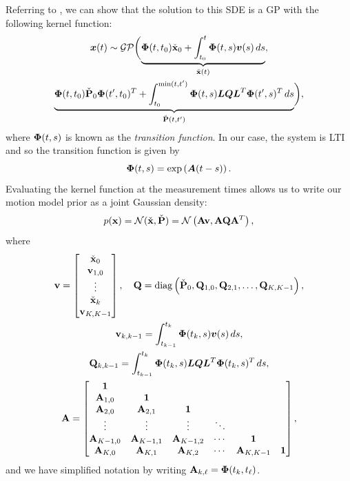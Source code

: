Referring to \citet{barfoot_ser24}, we can show that the solution to this \ac{SDE} is a \ac{GP} with the following kernel function:
\begin{multline}
{\boldsymbol{x}}(t) \sim \mathcal{GP} \biggl(  \underbrace{{\boldsymbol{\Phi}}(t,t_0)\check{\mathbf{x}}_0 + \int_{t_0}^t {\boldsymbol{\Phi}}(t,s) {\boldsymbol{v}}(s) \, ds}_{\check{\mathbf{x}}(t)},  \\ \underbrace{{\boldsymbol{\Phi}}(t,t_0) \check{\mathbf{P}}_0 {\boldsymbol{\Phi}}(t^\prime,t_0)^T + \int_{t_0}^{\min(t,t^\prime)} {\boldsymbol{\Phi}}(t,s) {\boldsymbol{L}}{\boldsymbol{Q}}{\boldsymbol{L}}^T {\boldsymbol{\Phi}}(t^\prime,s)^T  \, ds}_{\check{\mathbf{P}}(t,t^\prime)} \biggr),
\end{multline}
where ${\boldsymbol{\Phi}}(t,s)$ is known as the {\em transition function}.  In our case, the system is \ac{LTI} and so the transition function is given by
\begin{equation}
{\boldsymbol{\Phi}}(t,s) = \exp\left( {\boldsymbol{A}}(t-s) \right).
\end{equation}
Evaluating the kernel function at the measurement times allows us to write our motion model prior as a joint Gaussian density:
\begin{equation}
\label{eq:gpprior}
p(\mathbf{x}) = \mathcal{N}(\check{\mathbf{x}}, \check{\mathbf{P}}) = \mathcal{N} \left( \mathbf{A} \mathbf{v}, \mathbf{A} \mathbf{Q} \mathbf{A}^T \right),
\end{equation}
where
\begin{gather}
\mathbf{v} = \begin{bmatrix} \check{\mathbf{x}}_0 \\ \mathbf{v}_{1,0} \\ \vdots \\ \check{\mathbf{x}}_k\\ \mathbf{v}_{K,K-1} \end{bmatrix}, \quad 
\mathbf{Q} = \textup{diag}\left( \check{\mathbf{P}}_0, \mathbf{Q}_{1,0}, \mathbf{Q}_{2,1}, \ldots, \mathbf{Q}_{K,K-1} \right), \\
\mathbf{v}_{k,k-1} = \int_{t_{k-1}}^{t_k} {\boldsymbol{\Phi}}(t_k,s) {\boldsymbol{v}}(s) \, ds, \\
\mathbf{Q}_{k,k-1} = \int_{t_{k-1}}^{t_k} {\boldsymbol{\Phi}}(t_k,s) {\boldsymbol{L}} {\boldsymbol{Q}} {\boldsymbol{L}}^T {\boldsymbol{\Phi}}(t_k,s)^T \, ds, \nonumber \\
 \mathbf{A} = \begin{bmatrix} \mathbf{1} &  &  &  &   & \\
\mathbf{A}_{1,0} & \mathbf{1} &  &  &  &  \\
\mathbf{A}_{2,0} & \mathbf{A}_{2,1} & \mathbf{1} & &  &  \\
\vdots & \vdots & \vdots & \ddots &  & \\
\mathbf{A}_{K-1,0} & \mathbf{A}_{K-1,1} & \mathbf{A}_{K-1,2} & \cdots & \mathbf{1} &  \\
\mathbf{A}_{K,0} & \mathbf{A}_{K,1} & \mathbf{A}_{K,2} & \cdots & \mathbf{A}_{K,K-1} & \mathbf{1}
\end{bmatrix}, \nonumber
\end{gather}
and we have simplified notation by writing $\mathbf{A}_{k,\ell} = {\boldsymbol{\Phi}}(t_k, t_\ell)$.

